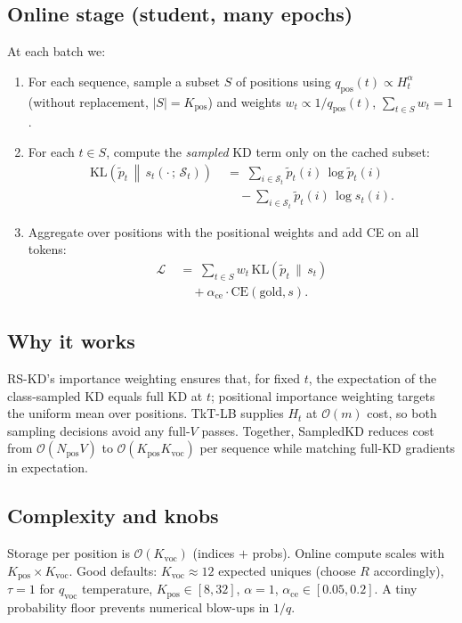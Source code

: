 \documentclass[11pt]{article}
\begin{document}
\subsection{Online stage (student, many epochs)}
At each batch we:
\begin{enumerate}
	\item For each sequence, sample a subset $S$ of positions using $q_{\text{pos}}(t)\!\propto\!H_t^\alpha$ (without replacement, $|S|{=}K_{\text{pos}}$) and weights $w_t \propto 1/q_{\text{pos}}(t)$, $\sum_{t\in S}w_t{=}1$.
	\item For each $t \in S$, compute the \emph{sampled} KD term only on the cached subset:
	      \begin{align*}
		      \mathrm{KL}\!\left(\tilde p_t \,\middle\|\, s_t(\cdot\,;\,\mathcal{S}_t)\right)
		      \; & =\; \sum_{i \in \mathcal{S}_t} \tilde p_t(i)\,\log \tilde p_t(i) \\
		         & \quad - \sum_{i \in \mathcal{S}_t} \tilde p_t(i)\,\log s_t(i).
	      \end{align*}
	\item Aggregate over positions with the positional weights and add CE on all tokens:
	      \begin{align*}
		      \mathcal{L} \; & =\; \sum_{t\in S} w_t\, \mathrm{KL}\!\left(\tilde p_t \,\|\, s_t\right) \\
		                     & \quad + \alpha_{\text{ce}} \cdot \text{CE}(\text{gold}, s).
	      \end{align*}
\end{enumerate}

\subsection{Why it works}
RS-KD's importance weighting ensures that, for fixed $t$, the expectation of the class-sampled KD equals full KD at $t$; positional importance weighting targets the uniform mean over positions.
TkT-LB supplies $H_t$ at $\mathcal{O}(m)$ cost, so both sampling decisions avoid any full-$V$ passes.
Together, SampledKD reduces cost from $\mathcal{O}(N_{\text{pos}}V)$ to $\mathcal{O}(K_{\text{pos}}K_{\text{voc}})$ per sequence while matching full-KD gradients in expectation.

\subsection{Complexity and knobs}
Storage per position is $\mathcal{O}(K_{\text{voc}})$ (indices $+$ probs). Online compute scales with $K_{\text{pos}}\!\times\!K_{\text{voc}}$. Good defaults:
$K_{\text{voc}}\!\approx\!12$ expected uniques (choose $R$ accordingly),
$\tau{=}1$ for $q_{\text{voc}}$ temperature,
$K_{\text{pos}}\!\in\![8,32]$,
$\alpha{=}1$,
$\alpha_{\text{ce}}\!\in\![0.05,0.2]$.
A tiny probability floor prevents numerical blow-ups in $1/q$.
\end{document}
